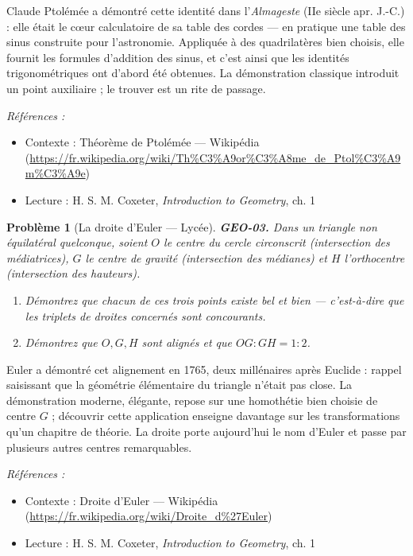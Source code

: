 \documentclass[11pt]{article}
\newtheorem{problem}{Problème}
\newenvironment{refs}{\par\small\noindent\emph{Références :}\begin{itemize}\setlength\itemsep{0pt}}{\end{itemize}\normalsize}
\begin{document}
\noindent Claude Ptolémée a démontré cette identité dans l'\textit{Almageste}
(IIe siècle apr. J.-C.) : elle était le c\oe{}ur calculatoire de sa table des cordes ---
en pratique une table des sinus construite pour l'astronomie. Appliquée à des quadrilatères
bien choisis, elle fournit les formules d'addition des sinus, et c'est ainsi que les identités
trigonométriques ont d'abord été obtenues. La démonstration classique introduit un point
auxiliaire ; le trouver est un rite de passage.

\begin{refs}
\item Contexte : Théorème de Ptolémée --- Wikipédia (\url{https://fr.wikipedia.org/wiki/Th%C3%A9or%C3%A8me_de_Ptol%C3%A9m%C3%A9e})
\item Lecture : H. S. M. Coxeter, \textit{Introduction to Geometry}, ch. 1
\end{refs}

\bigskip

\begin{problem}[{La droite d'Euler --- Lycée}]
\textbf{GEO-03.} Dans un triangle non équilatéral quelconque, soient $ O $ le centre du
cercle circonscrit (intersection des médiatrices), $ G $ le centre de gravité (intersection
des médianes) et $ H $ l'orthocentre (intersection des hauteurs).
\begin{enumerate}
\item[(a)] Démontrez que chacun de ces trois points existe bel et bien --- c'est-à-dire que les triplets
de droites concernés sont concourants.
\item[(b)] Démontrez que $ O, G, H $ sont alignés et que $ OG : GH = 1 : 2 $.
\end{enumerate}

\end{problem}

\noindent Euler a démontré cet alignement en 1765, deux millénaires après Euclide :
rappel saisissant que la géométrie élémentaire du triangle n'était pas close. La démonstration
moderne, élégante, repose sur une homothétie bien choisie de centre $ G $ ; découvrir cette
application enseigne davantage sur les transformations qu'un chapitre de théorie. La droite
porte aujourd'hui le nom d'Euler et passe par plusieurs autres centres remarquables.

\begin{refs}
\item Contexte : Droite d'Euler --- Wikipédia (\url{https://fr.wikipedia.org/wiki/Droite_d%27Euler})
\item Lecture : H. S. M. Coxeter, \textit{Introduction to Geometry}, ch. 1
\end{refs}
\end{document}
